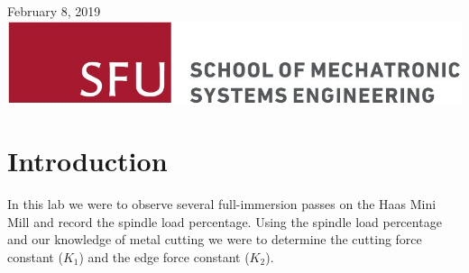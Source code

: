 \documentclass[12pt]{article}
\begin{document}
\begin{titlepage}
{\large February 8, 2019}\\[2cm] %


\includegraphics[scale=2.0]{MSE-Logo.jpg}\\[1cm] %

\vfill %

\end{titlepage}

\tableofcontents	%

\listoffigures
{}	%

 \listoftables

\lstlistoflistings
{}

\pagebreak
\setcounter{page}{1}	%
\setlength{\parskip}{1em}

\section{Introduction}
In this lab we were to observe several full-immersion passes on the Haas Mini Mill and record the spindle load percentage. Using the spindle load percentage and our knowledge of metal cutting we were to determine the cutting force constant ($K_1$) and the edge force constant ($K_2$).
\end{document}
